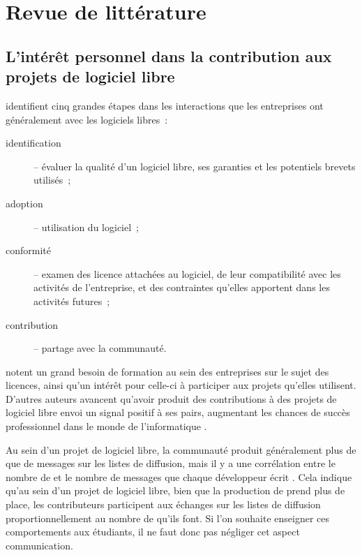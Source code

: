 \chapter{Revue de littérature}

\section{L'intérêt personnel dans la contribution aux projets de logiciel libre}


 identifient cinq grandes étapes dans les interactions que les entreprises ont
généralement avec les logiciels libres :
\begin{description}
    \item[identification] -- évaluer la qualité d'un logiciel libre, ses garanties et les potentiels brevets
        utilisés ;
    \item[adoption] -- utilisation du logiciel ;
    \item[conformité] -- examen des licence attachées au logiciel, de leur compatibilité avec les activités de
        l'entreprise, et des contraintes qu'elles apportent dans les activités futures ;
    \item[contribution] -- partage avec la communauté.
\end{description}

\textcite{strategies-2012} notent un grand besoin de formation au sein des entreprises sur le sujet des
licences, ainsi qu'un intérêt pour celle-ci à participer aux projets qu'elles utilisent. D'autres auteurs
avancent qu'avoir produit des contributions à des projets de logiciel libre envoi un signal positif à ses
pairs, augmentant les chances de succès professionnel dans le monde de l'informatique
.

Au sein d'un projet de logiciel libre, la communauté produit généralement plus de  que de
messages sur les listes de diffusion, mais il y a une corrélation entre le nombre de  et le
nombre de messages que chaque développeur écrit . Cela indique qu'au
sein d'un projet de logiciel libre, bien que la production de  prend plus de place, les
contributeurs participent aux échanges sur les listes de diffusion proportionnellement au nombre de
 qu'ils font. Si l'on souhaite enseigner ces comportements aux étudiants, il ne faut donc pas
négliger cet aspect communication.

